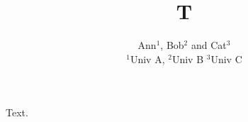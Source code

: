 \documentclass{article}
\title{T}
\author{Ann$^{1}$, Bob$^{2}$ and Cat$^{3}$ \\ {\small $^1$Univ A, $^2$Univ B} \vspace{1mm} $^3$Univ C}
\begin{document}
\maketitle
Text.
\end{document}
